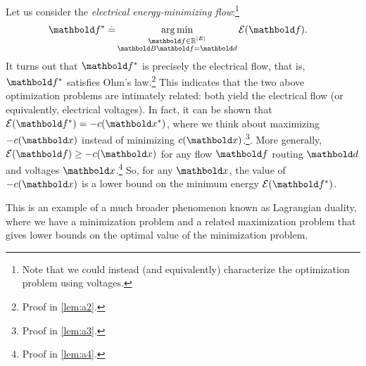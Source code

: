 Let us consider the \emph{electrical energy-minimizing flow}:\footnote{Note that we could instead (and equivalently) characterize the optimization problem using voltages.} \begin{align}
    \s{\vf} \defeq &\argmin_{\substack{\vf \in \R^{|\sE|} \\ \mB\vf = \vd}} \mathcal{E}(\vf). \label{eq:electrical_energy_minimizing_flow}
\end{align} It turns out that $\s{\vf}$ is precisely the electrical flow, that is, $\s{\vf}$ satisfies Ohm's law.\footnote{Proof in \cref{lem:a2}.} This indicates that the two above optimization problems are intimately related: both yield the electrical flow (or equivalently, electrical voltages). In fact, it can be shown that $\mathcal{E}(\s{\vf}) = -c(\s{\vx})$, where we think about maximizing $-c(\vx)$ instead of minimizing $c(\vx)$.\footnote{Proof in \cref{lem:a3}.}. More generally, $\mathcal{E}(\vf) \geq -c(\vx)$ for any flow $\vf$ routing $\vd$ and voltages $\vx$.\footnote{Proof in \cref{lem:a4}.} So, for any $\vx$, the value of $-c(\vx)$ is a lower bound on the minimum energy $\mathcal{E}(\s{\vf})$.

This is an example of a much broader phenomenon known as Lagrangian duality, where we have a minimization problem and a related maximization problem that gives lower bounds on the optimal value of the minimization problem.